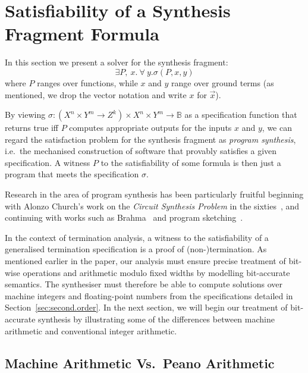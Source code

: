 \documentclass[preprint]{sigplanconf}
\theoremstyle{definition}
\begin{document}


\section{Satisfiability of a Synthesis Fragment Formula} \label{sec:synthesis}

In this section we present a solver for the synthesis fragment:
%
\[
  \exists P,~ x . ~\forall~ y . \sigma(P, x, y)
\]
%
where $P$ ranges over functions, while $x$ and $y$ range over ground terms
(as mentioned, we drop the vector notation and write $x$ for $\vec{x}$).

By viewing $\sigma: (X^n \times Y^m \to Z^k) \times X^n \times Y^m  \to
\mathbb{B}$ as a specification function that returns true iff $P$ computes
appropriate outputs for the inputs $x$ and $y$, we can regard the
satisfaction problem for the synthesis fragment as \emph{program synthesis},
i.e.~the mechanised construction of software that provably satisfies a
given specification.  A witness $P$ to the satisfiability of some
formula is then just a program that meets the specification $\sigma$.

Research in the area of program synthesis has been
particularly fruitful beginning with Alonzo Church's work on the
\emph{Circuit Synthesis Problem} in the sixties~\cite{church-synth}, and
continuing with works such as {\sc Brahma}~\cite{brahma} and program
sketching~\cite{lezama-thesis,sketch,modular-sketch}.

In the context of termination analysis, a witness to the
satisfiability of a generalised termination specification is a
proof of \mbox{(non-)termination}.  As mentioned earlier in the paper, our
analysis must ensure precise treatment of bit-wise operations and arithmetic
modulo fixed widths by modelling bit-accurate semantics.  The synthesiser
must therefore be able to compute solutions over machine
integers and floating-point numbers from the specifications detailed in
Section~\ref{sec:second.order}.  In the next section, we will begin our treatment of
bit-accurate synthesis by illustrating some of the differences between
machine arithmetic and conventional integer arithmetic.


\subsection{Machine Arithmetic Vs.~Peano Arithmetic} \label{sec:machine.arith} 
\end{document}

